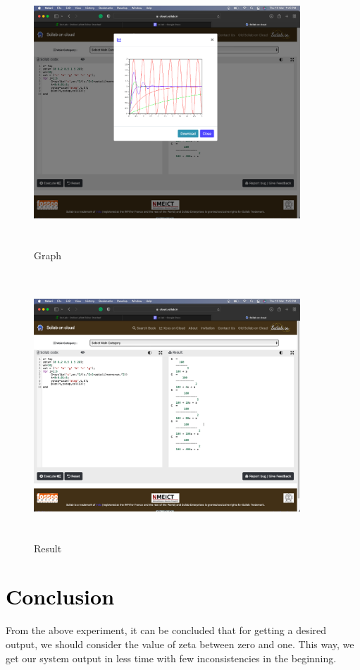 \documentclass[12pt]{article}
\begin{document}
\begin{figure}[!hth]
        \centering
        \includegraphics[width =10cm, height = 10cm]{images/exp121.png}
        \caption{Graph}
        \label{Graph}
\end{figure}
\begin{figure}[!hth]
        \centering
        \includegraphics[width =10cm, height = 10cm]{images/exp122.png}
        \caption{Result}
        \label{Result}
\end{figure}

\section*{\textcolor{black}{Conclusion}}
From the above experiment, it can be concluded that for getting a desired output, we should consider the value of zeta between zero and one. This way, we get our system output in less time with few inconsistencies in the beginning.
 
\end{document}
